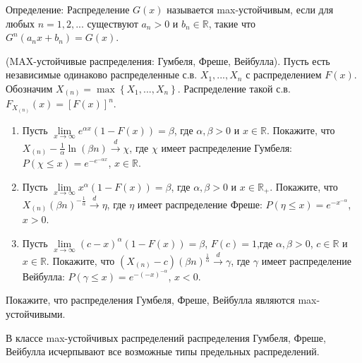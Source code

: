 \begin{problem}

Определение: Распределение $G\left(x\right)$ называется max-устойчивым, если для любых $n=1,2,...$ существуют $a_{n} >0$ и $b_{n} \in {\mathbb R}$, такие что $G^{n} \left(a_{n} x+b_{n} \right)=G\left(x\right)$.


(MAX-устойчивые распределения: Гумбеля, Фреше, Вейбулла). Пусть есть независимые одинаково распределенные с.в. $X_{1} ,...,X_{n} $ с распределением $F\left(x\right)$. Обозначим $X_{\left(n\right)} =\max \left\{X_{1} ,...,X_{n} \right\}$. Распределение такой с.в. $F_{X_{\left(n\right)} } \left(x\right)=\left[F\left(x\right)\right]^{n} $.

\begin{enumerate}
\item  Пусть $\mathop{\lim }\limits_{x\to \infty } e^{\alpha x} \left(1-F\left(x\right)\right)=\beta $, где $\alpha ,\beta >0$ и $x\in {\mathbb R}$. Покажите, что $X_{\left(n\right)} -\frac{1}{\alpha } \ln \left(\beta n\right)\mathop{\to }\limits^{d} \chi $, где $\chi $ имеет распределение Гумбеля: $P\left(\chi \le x\right)=e^{-e^{-\alpha x} } $, $x\in {\mathbb R}$.

\item  Пусть $\mathop{\lim }\limits_{x\to \infty } x^{\alpha } \left(1-F\left(x\right)\right)=\beta $, где $\alpha ,\beta >0$ и $x\in {\mathbb R}_{+} $. Покажите, что $X_{\left(n\right)} \left(\beta n\right)^{-\frac{1}{\alpha } } \mathop{\to }\limits^{d} \eta $, где $\eta $ имеет распределение Фреше: $P\left(\eta \le x\right)=e^{-x^{-\alpha } } $, $x>0$.

\item  Пусть $\mathop{\lim }\limits_{x\to \infty } \left(c-x\right)^{\alpha } \left(1-F\left(x\right)\right)=\beta $, $F\left(c\right)=1$,где $\alpha ,\beta >0$, $c\in {\mathbb R}$ и $x\in {\mathbb R}$. Покажите, что $\left(X_{\left(n\right)} -c\right)\left(\beta n\right)^{\frac{1}{\alpha } } \mathop{\to }\limits^{d} \gamma $, где $\gamma $ имеет распределение Вейбулла: $P\left(\gamma \le x\right)=e^{-(-x)^{-\alpha } } $, $x<0$.

\end{enumerate}

\noindent Покажите, что распределения Гумбеля, Фреше, Вейбулла являются max-устойчивыми.

\begin{remark}
В классе max-устойчивых распределений распределения Гумбеля, Фреше, Вейбулла исчерпывают все возможные типы предельных распределений.
\end{remark}

\end{problem}



